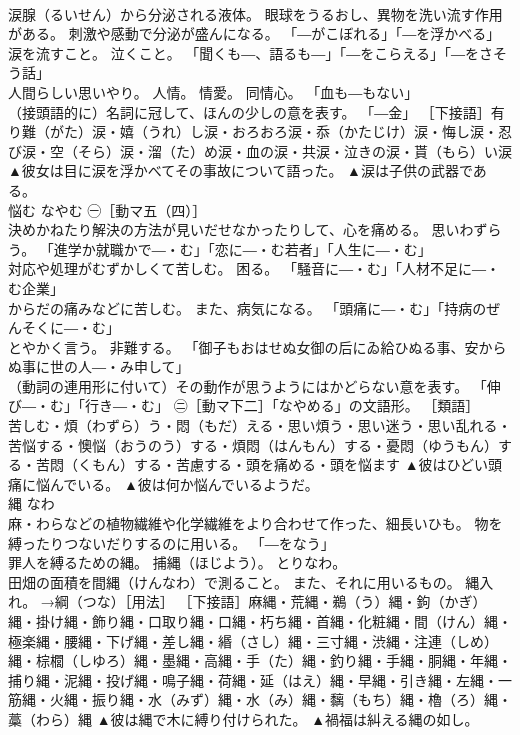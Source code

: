 \documentclass[8pt]{extreport}
\begin{document}
\begin{CJK}{UTF8}{min}
\\	涙腺（るいせん）から分泌される液体。 眼球をうるおし、異物を洗い流す作用がある。 刺激や感動で分泌が盛んになる。 「―がこぼれる」「―を浮かべる」 
\\	涙を流すこと。 泣くこと。 「聞くも―、語るも―」「―をこらえる」「―をさそう話」 
\\	人間らしい思いやり。 人情。 情愛。 同情心。 「血も―もない」 
\\	（接頭語的に）名詞に冠して、ほんの少しの意を表す。 「―金」 ［下接語］有り難（がた）涙・嬉（うれ）し涙・おろおろ涙・忝（かたじけ）涙・悔し涙・忍び涙・空（そら）涙・溜（た）め涙・血の涙・共涙・泣きの涙・貰（もら）い涙	▲彼女は目に涙を浮かべてその事故について語った。 ▲涙は子供の武器である。
\\	悩む	なやむ	㊀［動マ五（四）］ 
\\	決めかねたり解決の方法が見いだせなかったりして、心を痛める。 思いわずらう。 「進学か就職かで―・む」「恋に―・む若者」「人生に―・む」 
\\	対応や処理がむずかしくて苦しむ。 困る。 「騒音に―・む」「人材不足に―・む企業」 
\\	からだの痛みなどに苦しむ。 また、病気になる。 「頭痛に―・む」「持病のぜんそくに―・む」 
\\	とやかく言う。 非難する。 「御子もおはせぬ女御の后にゐ給ひぬる事、安からぬ事に世の人―・み申して」 
\\	（動詞の連用形に付いて）その動作が思うようにはかどらない意を表す。 「伸び―・む」「行き―・む」 ㊁［動マ下二］「なやめる」の文語形。 ［類語］ 
\\	苦しむ・煩（わずら）う・悶（もだ）える・思い煩う・思い迷う・思い乱れる・苦悩する・懊悩（おうのう）する・煩悶（はんもん）する・憂悶（ゆうもん）する・苦悶（くもん）する・苦慮する・頭を痛める・頭を悩ます	▲彼はひどい頭痛に悩んでいる。 ▲彼は何か悩んでいるようだ。
\\	縄	なわ	
\\	麻・わらなどの植物繊維や化学繊維をより合わせて作った、細長いひも。 物を縛ったりつないだりするのに用いる。 「―をなう」 
\\	罪人を縛るための縄。 捕縄（ほじよう）。 とりなわ。 
\\	田畑の面積を間縄（けんなわ）で測ること。 また、それに用いるもの。 縄入れ。 →綱（つな）［用法］ ［下接語］麻縄・荒縄・鵜（う）縄・鉤（かぎ）縄・掛け縄・飾り縄・口取り縄・口縄・朽ち縄・首縄・化粧縄・間（けん）縄・極楽縄・腰縄・下げ縄・差し縄・緡（さし）縄・三寸縄・渋縄・注連（しめ）縄・棕櫚（しゆろ）縄・墨縄・高縄・手（た）縄・釣り縄・手縄・胴縄・年縄・捕り縄・泥縄・投げ縄・鳴子縄・荷縄・延（はえ）縄・早縄・引き縄・左縄・一筋縄・火縄・振り縄・水（みず）縄・水（み）縄・黐（もち）縄・櫓（ろ）縄・藁（わら）縄	▲彼は縄で木に縛り付けられた。 ▲禍福は糾える縄の如し。

\end{CJK}
\end{document}

